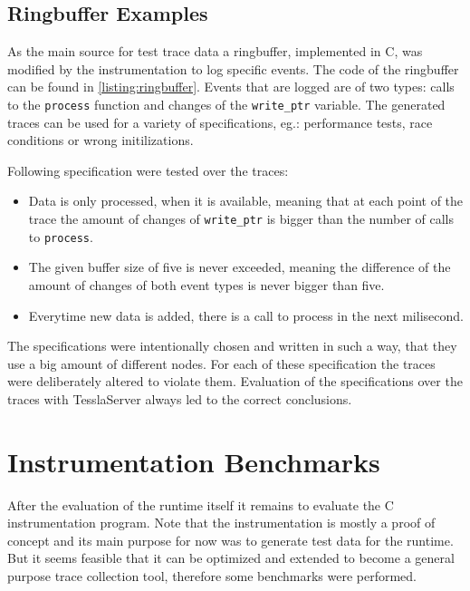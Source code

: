 \subsection{Ringbuffer Examples}

As the main source for test trace data a ringbuffer, implemented in C, was modified by the instrumentation to log specific events.
The code of the ringbuffer can be found in \cref{listing:ringbuffer}.
Events that are logged are of two types: calls to the \lstinline{process} function and changes of the \lstinline{write_ptr} variable.
The generated traces can be used for a variety of specifications, eg.: performance tests, race conditions or wrong initilizations.

Following specification were tested over the traces:

\begin{itemize}
  \item Data is only processed, when it is available, meaning that at each point of the trace the amount of changes of \lstinline{write_ptr} is bigger than the number of calls to \lstinline{process}.
  \item The given buffer size of five is never exceeded, meaning the difference of the amount of changes of both event types is never bigger than five.
  \item Everytime new data is added, there is a call to process in the next milisecond.
\end{itemize}

The specifications were intentionally chosen and written in such a way, that they use a big amount of different nodes.
For each of these specification the traces were deliberately altered to violate them.
Evaluation of the specifications over the traces with TesslaServer always led to the correct conclusions.

\section{Instrumentation Benchmarks}
\label{sec:evaluation:instrumentation_benchmarks}

After the evaluation of the runtime itself it remains to evaluate the C instrumentation program.
Note that the instrumentation is mostly a proof of concept and its main purpose for now was to generate test data for the runtime.
But it seems feasible that it can be optimized and extended to become a general purpose trace collection tool, therefore some benchmarks were performed.

